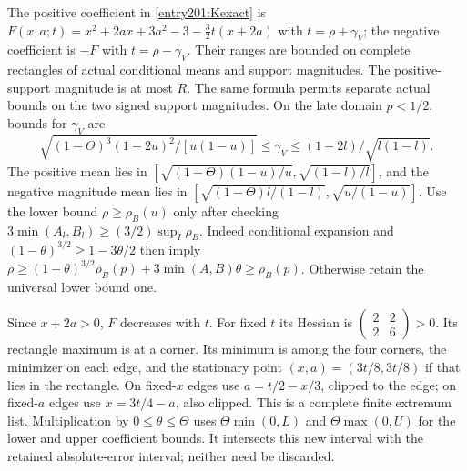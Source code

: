The positive coefficient in \eqref{entry201:Kexact} is
$F(x,a;t)=x^2+2ax+3a^2-3-\tfrac32t(x+2a)$
with $t=\rho+\gamma_V$; the negative coefficient is $-F$
with $t=\rho-\gamma_V$. Their ranges are bounded on complete
rectangles of actual conditional means and support magnitudes.
The positive-support magnitude is at most $R$.
The same formula permits separate actual bounds on the two signed support magnitudes.
On the late domain $p<1/2$, bounds for $\gamma_V$ are
\[
 \sqrt{(1-\Theta)^3(1-2u)^2/[u(1-u)]}
 \le\gamma_V\le(1-2l)/\sqrt{l(1-l)}.
\]
The positive mean lies in
$[\sqrt{(1-\Theta)(1-u)/u},\sqrt{(1-l)/l}]$, and the negative
magnitude mean lies in
$[\sqrt{(1-\Theta)l/(1-l)},\sqrt{u/(1-u)}]$.
Use the lower bound $\rho\ge\rho_B(u)$ only after checking
$3\min(A_l,B_l)\ge(3/2)\sup_I\rho_B$. Indeed conditional expansion
and $(1-\theta)^{3/2}\ge1-3\theta/2$ then imply
$\rho\ge(1-\theta)^{3/2}\rho_B(p)+3\min(A,B)\theta\ge\rho_B(p)$.
Otherwise retain the universal lower bound one.

Since $x+2a>0$, $F$ decreases with $t$.
For fixed $t$ its Hessian is
$\left(\begin{smallmatrix}2&2\\2&6\end{smallmatrix}\right)>0$.
Its rectangle maximum is at a corner. Its minimum is among the four
corners, the minimizer on each edge, and the stationary point
$(x,a)=(3t/8,3t/8)$ if that lies in the rectangle.
On fixed-$x$ edges use $a=t/2-x/3$, clipped to the edge; on
fixed-$a$ edges use $x=3t/4-a$, also clipped.
This is a complete finite extremum list.
Multiplication by $0\le\theta\le\Theta$ uses
$\Theta\min(0,L)$ and $\Theta\max(0,U)$ for the lower and upper
coefficient bounds. It intersects this new interval with the retained
absolute-error interval; neither need be discarded.


